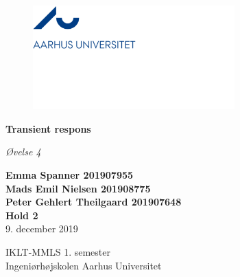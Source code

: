 \begin{titlepage}


\begin{center}

\begin{figure}
\includegraphics[height=4cm]{M_Fig/1_AU-Logo}
\end{figure}

\vspace*{4.5\baselineskip}
	
		{\Huge \textbf{Transient respons\\}}
		
		\large{\textit{Øvelse 4}}\\ 
		\vspace{0.5\baselineskip}
		
	
        \vspace*{6\baselineskip}

\normalsize{\textbf{Emma Spanner 201907955}}\\
		\normalsize{\textbf{Mads Emil Nielsen 201908775}}\\
		\normalsize{\textbf{Peter Gehlert Theilgaard 201907648}}\\
		
		\vspace{0,7\baselineskip}
		\small{\textbf{Hold 2}}\\
		
        \vspace{4\baselineskip}
		\large{9. december 2019}\\
		\vspace{1.5\baselineskip}
		
		\large{IKLT-MMLS 1. semester}\\
		\large{Ingeniørhøjskolen Aarhus Universitet}\\
		
		\vspace{1,5\baselineskip}
		
	\end{center}
\end{titlepage}

